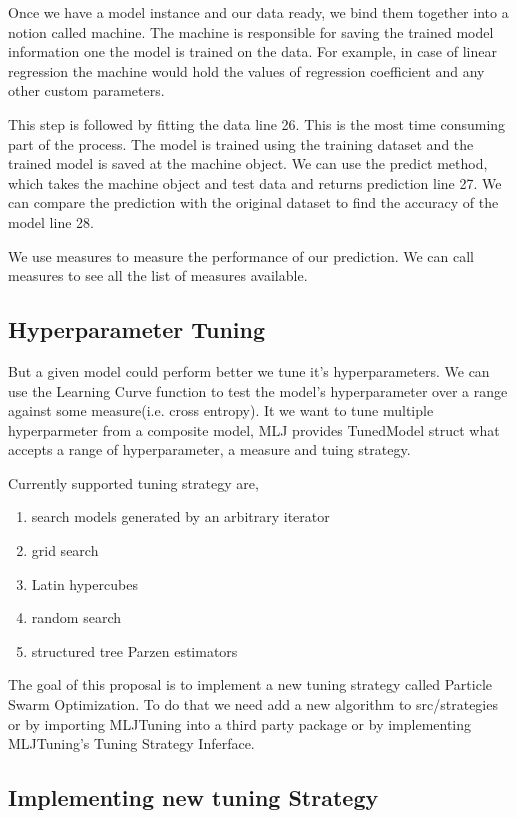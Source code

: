 \documentclass{article}
\begin{document}
Once we have a model instance and our data ready, we bind them together into a notion called machine. The machine is responsible for saving the trained model information one the model is trained on the data. For example, in case of linear regression the machine would hold the values of regression coefficient and any other custom parameters.

This step is followed by fitting the data line 26. This is the most time consuming part of the process. The model is trained using the training dataset and the trained model is saved at the machine object. We can use the predict method, which takes the machine object and test data and returns prediction line 27. We can compare the prediction with the original dataset to find the accuracy of the model line 28.

We use measures to measure the performance of our prediction. We can call measures to see all the list of measures available.

\subsection{Hyperparameter Tuning}
But a given model could perform better we tune it's hyperparameters. We can use the Learning Curve function to test the model's hyperparameter over a range against some measure(i.e. cross entropy). It we want to tune multiple hyperparmeter from a composite model, MLJ provides TunedModel struct what accepts a range of hyperparameter, a measure and tuing strategy.

Currently supported tuning strategy are, 
\begin{enumerate}
    \item search models generated by an arbitrary iterator
    \item  grid search 
    \item Latin hypercubes
    \item random search
    \item structured tree Parzen estimators
\end{enumerate}

The goal of this proposal is to implement a new tuning strategy called Particle Swarm Optimization. To do that we need add a new algorithm to src/strategies or by importing MLJTuning into a third party package or by implementing MLJTuning's Tuning Strategy Inferface.

\subsection{Implementing new tuning Strategy}
\end{document}
